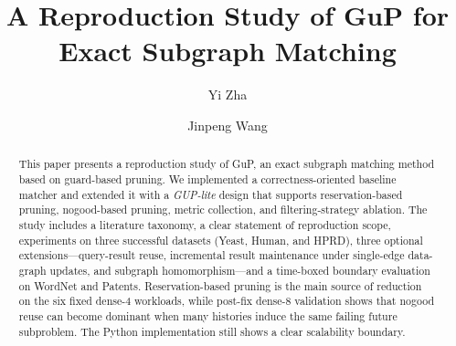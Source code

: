 \documentclass[manuscript,screen]{acmart}
\title{A Reproduction Study of GuP for Exact Subgraph Matching}
\author{Yi Zha}
\affiliation{%
  \institution{Tsinghua University}
  \city{Beijing}
  \country{China}}
\author{Jinpeng Wang}
\affiliation{%
  \institution{Tsinghua University}
  \city{Beijing}
  \country{China}}
\begin{document}
\begin{abstract}
This paper presents a reproduction study of GuP, an exact subgraph matching method based on guard-based pruning. We implemented a correctness-oriented baseline matcher and extended it with a \emph{GUP-lite} design that supports reservation-based pruning, nogood-based pruning, metric collection, and filtering-strategy ablation. The study includes a literature taxonomy, a clear statement of reproduction scope, experiments on three successful datasets (Yeast, Human, and HPRD), three optional extensions---query-result reuse, incremental result maintenance under single-edge data-graph updates, and subgraph homomorphism---and a time-boxed boundary evaluation on WordNet and Patents. Reservation-based pruning is the main source of reduction on the six fixed dense-4 workloads, while post-fix dense-8 validation shows that nogood reuse can become dominant when many histories induce the same failing future subproblem. The Python implementation still shows a clear scalability boundary.
\end{abstract}

\maketitle



















\end{document}
